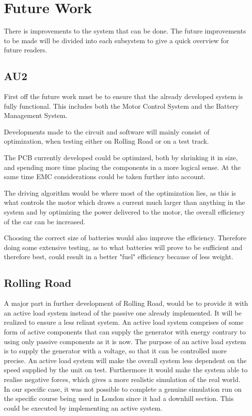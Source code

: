\chapter {Future Work}
There is improvements to the system that can be done. The future improvements to be made will be divided into each subsystem to give a quick overview for future readers. 

\section{AU2}
First off the future work must be to ensure that the already developed system is fully functional. This includes both the Motor Control System and the Battery Management System.

Developments made to the circuit and software will mainly consist of optimization, when testing either on Rolling Road or on a test track. 

The PCB currently developed could be optimized, both by shrinking it in size, and spending more time placing the components in a more logical sense. At the same time EMC considerations could be taken further into account. 

The driving algorithm would be where most of the optimization lies, as this is what controls the motor which draws a current much larger than anything in the system and by optimizing the power delivered to the motor, the overall efficiency of the car can be increased. 

Choosing the correct size of batteries would also improve the efficiency. Therefore doing some extensive testing, as to what batteries will prove to be sufficient and therefore best, could result in a better "fuel" efficiency because of less weight.  

\section{Rolling Road}
A major part in further development of Rolling Road, would be to provide it with an active load system instead of the passive one already implemented. It will be realized to ensure a less reliant system. An active load system comprises of some form of active components that can supply the generator with energy contrary to using only passive components as it is now. The purpose of an active load system is to supply the generator with a voltage, so that it can be controlled more precise. An active load system will make the overall system less dependent on the speed supplied by the unit on test. Furthermore it would make the system able to realise negative forces, which gives a more realistic simulation of the real world. In our specific case, it was not possible to complete a genuine simulation run on the specific course being used in London since it had a downhill section. This could be executed by implementing an active system. 

